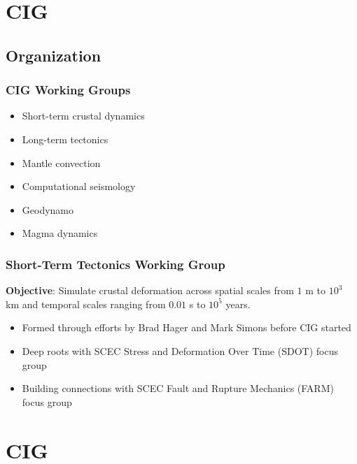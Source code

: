 \documentclass{beamer}
\begin{document}
\section{CIG}
\subsection{Organization}

\begin{frame}
  \frametitle{CIG Working Groups}
 
 \begin{itemize}
 \item Short-term crustal dynamics
 \item Long-term tectonics
 \item Mantle convection
 \item Computational seismology
 \item Geodynamo
 \item Magma dynamics
 \end{itemize}

\end{frame}


\begin{frame}
  \frametitle{Short-Term Tectonics Working Group}
  \summary{}
 
 \vfill
 
 \textbf{Objective}: Simulate crustal deformation across spatial
 scales from $1$ m to $10^3$ km and temporal scales ranging from
 $0.01$ s to $10^5$ years.

 \vfill
 \begin{itemize}
 \item Formed through efforts by Brad Hager and Mark Simons before CIG started
 \item Deep roots with SCEC Stress and Deformation Over Time (SDOT) focus group
 \item Building connections with SCEC Fault and Rupture Mechanics (FARM) focus group
 \end{itemize}
\vfill

\end{frame} 


\section{CIG}
\end{document}
